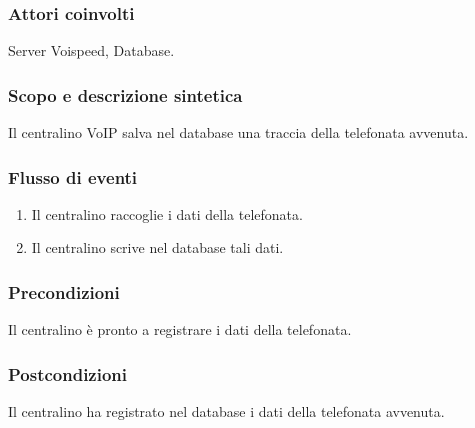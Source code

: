 \subsubsection*{Attori coinvolti} Server Voispeed, Database.
\subsubsection*{Scopo e descrizione sintetica}
Il centralino VoIP salva nel database una traccia della telefonata avvenuta.
\subsubsection*{Flusso di eventi}
\begin{enumerate}
\item Il centralino raccoglie i dati della telefonata.
\item Il centralino scrive nel database tali dati.
\end{enumerate}
\subsubsection*{Precondizioni} Il centralino \`e pronto a registrare i dati della telefonata.
\subsubsection*{Postcondizioni} Il centralino ha registrato nel database i dati della telefonata avvenuta.

\newpage
